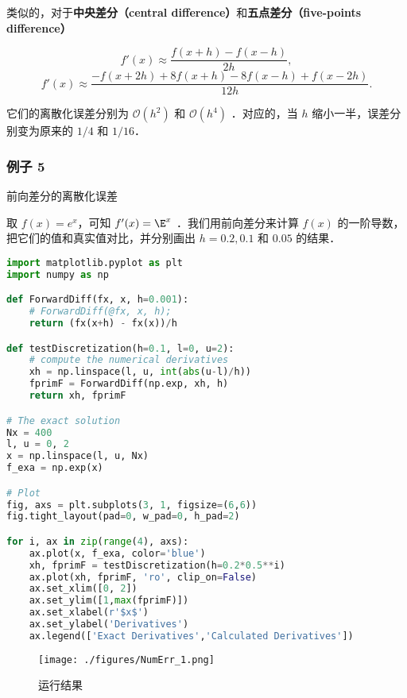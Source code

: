 类似的，对于\textbf{中央差分（central difference）}和\textbf{五点差分（five-points difference）}

\begin{equation}
f'(x)\approx \frac{f(x+h)-f(x-h)}{2h},
\end{equation}
\begin{equation}
f'(x) \approx \frac{-f(x+2h)+8f(x+h)-8f(x-h)+f(x-2h)}{12h}.
\end{equation}

它们的离散化误差分别为 $\mathcal{O}(h^2)$ 和  $\mathcal{O}(h^4)$  ．对应的，当  $h$  缩小一半，误差分别变为原来的 $1/4$ 和 $1/16$．

\subsubsection{例子 5}

前向差分的离散化误差

取 $f(x)=e^x$，可知  $f'(x)=\E^x$  ．我们用前向差分来计算  $f(x)$  的一阶导数，把它们的值和真实值对比，并分别画出  $h=0.2, 0.1$  和  $0.05$  的结果．

\begin{lstlisting}[language=python]
import matplotlib.pyplot as plt
import numpy as np

def ForwardDiff(fx, x, h=0.001):
    # ForwardDiff(@fx, x, h);
    return (fx(x+h) - fx(x))/h

def testDiscretization(h=0.1, l=0, u=2):
    # compute the numerical derivatives
    xh = np.linspace(l, u, int(abs(u-l)/h))
    fprimF = ForwardDiff(np.exp, xh, h)
    return xh, fprimF

# The exact solution
Nx = 400
l, u = 0, 2
x = np.linspace(l, u, Nx)
f_exa = np.exp(x)

# Plot
fig, axs = plt.subplots(3, 1, figsize=(6,6))
fig.tight_layout(pad=0, w_pad=0, h_pad=2)

for i, ax in zip(range(4), axs):
    ax.plot(x, f_exa, color='blue')
    xh, fprimF = testDiscretization(h=0.2*0.5**i)
    ax.plot(xh, fprimF, 'ro', clip_on=False)
    ax.set_xlim([0, 2])
    ax.set_ylim([1,max(fprimF)])
    ax.set_xlabel(r'$x$')
    ax.set_ylabel('Derivatives')
    ax.legend(['Exact Derivatives','Calculated Derivatives'])
\end{lstlisting}

\begin{figure}[ht]
\centering
\texttt{[image: ./figures/NumErr\_1.png]}
\caption{运行结果} \label{NumErr_fig1}
\end{figure}

